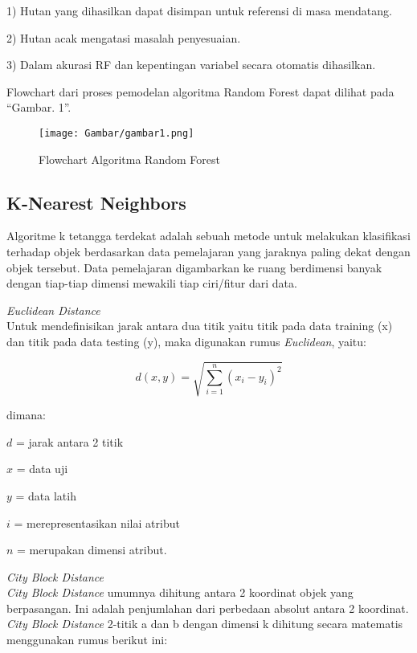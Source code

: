 \documentclass[conference]{IEEEtran}
\begin{document}
1) Hutan yang dihasilkan dapat disimpan untuk referensi
di masa mendatang.

2) Hutan acak mengatasi masalah penyesuaian.

3) Dalam akurasi RF dan kepentingan variabel secara
otomatis dihasilkan.

Flowchart dari proses pemodelan algoritma Random Forest
dapat dilihat pada “Gambar. 1”.

\begin{figure}
\centering
\texttt{[image: Gambar/gambar1.png]}
\caption{Flowchart Algoritma Random Forest}
\end{figure}

\subsection{K-Nearest Neighbors}

Algoritme k tetangga terdekat adalah sebuah metode untuk melakukan klasifikasi terhadap objek berdasarkan data pemelajaran yang jaraknya paling dekat dengan objek tersebut. Data pemelajaran digambarkan ke ruang berdimensi banyak dengan tiap-tiap dimensi mewakili tiap ciri/fitur dari data.

\noindent\emph{Euclidean Distance}\\
Untuk mendefinisikan jarak antara dua titik yaitu titik pada data training (x) dan titik pada data testing (y), maka digunakan rumus \emph{Euclidean}\cite{nurhadi2017aplikasi}, yaitu:

\begin{equation*}
d(x,y)=\sqrt{\sum^{n}_{i=1} (x_i-y_i)^2}
\label{eq1}
\end{equation*}

dimana:

$d$ = jarak antara 2 titik

$x$ = data uji

$y$ = data latih

$i$ = merepresentasikan nilai atribut

$n$ = merupakan dimensi atribut.\vspace{10pt}

\noindent\emph{City Block Distance}\\
\emph{City Block Distance} umumnya dihitung antara 2 koordinat objek yang berpasangan. Ini adalah penjumlahan dari perbedaan absolut antara 2 koordinat. \emph{City Block Distance} 2-titik a dan b dengan dimensi k dihitung secara matematis menggunakan rumus berikut ini:
\end{document}
